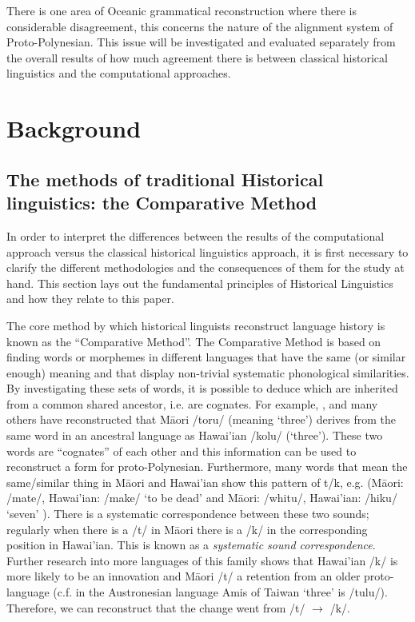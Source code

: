 \documentclass[draft,10pt]{article} %
\begin{document}
There is one area of Oceanic grammatical reconstruction where there is considerable disagreement, this concerns the nature of the alignment system of Proto-Polynesian. This issue will be investigated and evaluated separately from the overall results of how much agreement there is between classical historical linguistics and the computational approaches.



\section{Background}
\label{recon_grammar}


\subsection{The methods of traditional Historical linguistics: the Comparative Method}
\label{sec:ars:metod:hist}
In order to interpret the differences between the results of the computational approach versus the classical historical linguistics approach, it is first necessary to clarify the different methodologies and the consequences of them for the study at hand. This section lays out the fundamental principles of Historical Linguistics and how they relate to this paper.

The core method by which historical linguists reconstruct language history is known as the ``Comparative Method''. The Comparative Method is based on finding words or morphemes in different languages that have the same (or similar enough) meaning and that display non-trivial systematic phonological similarities. By investigating these sets of words, it is possible to deduce which are inherited from a common shared ancestor, i.e. are cognates. For example, \citet{blust2004}, \citet{greenhill2011pollex} and many others have reconstructed that M\={a}ori /toru/ (meaning `three') derives from the same word in an ancestral language as Hawai'ian /kolu/ (`three'). These two words are ``cognates'' of each other and this information can be used to reconstruct a form for proto-Polynesian. Furthermore, many words that mean the same/similar thing in M\={a}ori and Hawai'ian show this pattern of t/k, e.g. (M\={a}ori: /mate/, Hawai'ian: /make/ `to be dead'  and M\={a}ori: /whitu/, Hawai'ian: /hiku/ `seven' \citep{ABVD}). There is a systematic correspondence between these two sounds; regularly when there is a /t/ in M\={a}ori there is a /k/ in the corresponding position in Hawai'ian. This is known as a \emph{systematic sound correspondence}. Further research into more languages of this family shows that Hawai'ian /k/ is more likely to be an innovation and M\={a}ori /t/ a retention from an older proto-language (c.f. in the Austronesian language Amis of Taiwan `three' is /tulu/). Therefore, we can reconstruct that the change went from /t/ $\rightarrow$ /k/.
\end{document}
